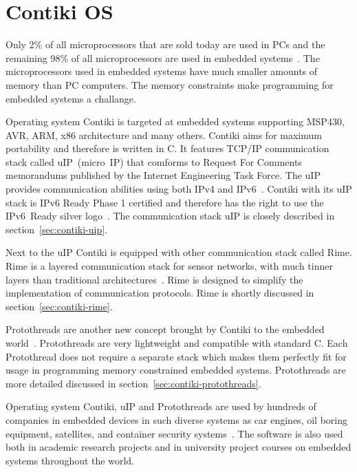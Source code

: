 
\chapter{Contiki OS}
Only 2\% of all microprocessors that are sold today are used in PCs and the remaining 98\%
of all microprocessors are used in embedded systems~\cite{thesis-programming}.
The microprocessors
used in embedded systems have much smaller amounts of memory than PC computers.
The memory constraints make programming for embedded systems a challange.

Operating system Contiki is targeted at embedded systems supporting MSP430, AVR, ARM, x86 architecture and many others.
Contiki aims for maximum portability and therefore is written in C.
It features TCP/IP communication stack called uIP~(micro~IP)
that comforms to Request For Comments memorandums published by the Internet Engineering Task Force.
The uIP provides communication abilities using both IPv4 and IPv6~\cite{contiki-docs}.
Contiki with its uIP stack is IPv6 Ready Phase 1 certified
and therefore has the right to use the IPv6~Ready silver logo~\cite{ipv6ready-db}.
The communication stack uIP is closely described in section~\ref{sec:contiki-uip}.

Next to the uIP Contiki is equipped with other communication stack called Rime.
Rime is a layered communication stack for sensor networks,
with much tinner layers than traditional architectures~\cite{paper-rime}.
Rime is designed to simplify the implementation of communication
protocols.
Rime is shortly discussed in section~\ref{sec:contiki-rime}.

Protothreads are another new concept brought by Contiki to the embedded world~\cite{paper-protothreads}.
Protothreads are very lightweight and compatible with standard C.
Each Protothread does not require a separate stack which makes them perfectly
fit for usage in programming memory constrained embedded systems.
Protothreads are more detailed discussed in section~\ref{sec:contiki-protothreads}.

Operating system Contiki, uIP and Protothreads are used by hundreds of companies in embedded devices in
such diverse systems as car engines, oil boring equipment, satellites, and container security systems~\cite{thesis-programming}.
The software is also used both in academic research
projects and in university project courses on embedded systems throughout the
world.

